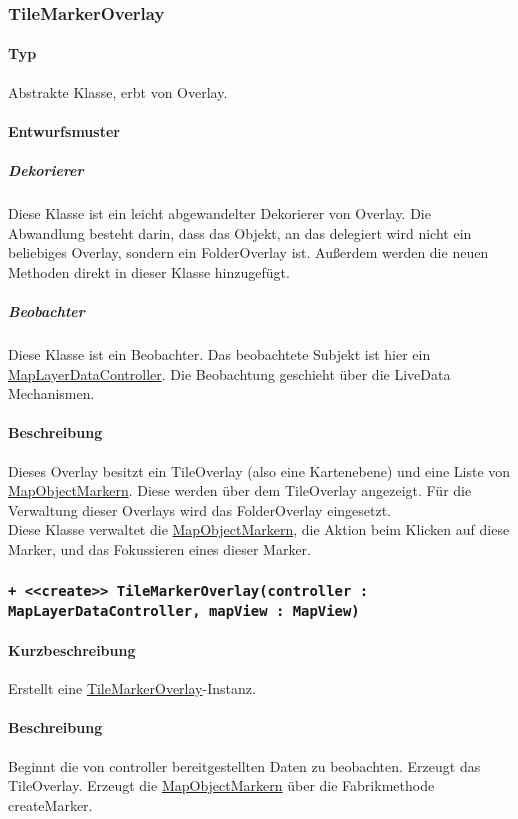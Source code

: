 \subsubsection{TileMarkerOverlay}\label{App_Map_View_TileMarkerOverlay}
\paragraph*{Typ} 
Abstrakte Klasse, erbt von Overlay.
\paragraph*{Entwurfsmuster}
\subparagraph*{Dekorierer}
Diese Klasse ist ein leicht abgewandelter Dekorierer von Overlay.
Die Abwandlung besteht darin, dass das Objekt, an das delegiert wird nicht ein
beliebiges Overlay, sondern ein FolderOverlay ist. Außerdem werden die neuen 
Methoden direkt in dieser Klasse hinzugefügt.\\
\subparagraph*{Beobachter}
Diese Klasse ist ein Beobachter. Das beobachtete Subjekt ist hier ein \hyperref[App_Map_ViewModel_MapLayerDataController]{MapLayerDataController}.
Die Beobachtung geschieht über die LiveData Mechanismen.
\paragraph*{Beschreibung}
Dieses Overlay besitzt ein TileOverlay (also eine Kartenebene) und eine 
Liste von \hyperref[App_Map_View_MapObjectMarker]{MapObjectMarkern}. Diese werden über dem TileOverlay angezeigt.
Für die Verwaltung dieser Overlays wird das FolderOverlay eingesetzt.\\
Diese Klasse verwaltet die \hyperref[App_Map_View_MapObjectMarker]{MapObjectMarkern}, die Aktion beim Klicken auf diese Marker, 
und das Fokussieren eines dieser Marker.

\subsubsection*{\texttt{+ <<create>> TileMarkerOverlay(controller : MapLayerDataController, mapView : MapView)}}%
\paragraph*{Kurzbeschreibung}
Erstellt eine \hyperref[App_Map_View_TileMarkerOverlay]{TileMarkerOverlay}-Instanz.
\paragraph*{Beschreibung}
Beginnt die von controller bereitgestellten Daten zu beobachten. Erzeugt das TileOverlay.
Erzeugt die \hyperref[App_Map_View_MapObjectMarker]{MapObjectMarkern} über die Fabrikmethode createMarker.
